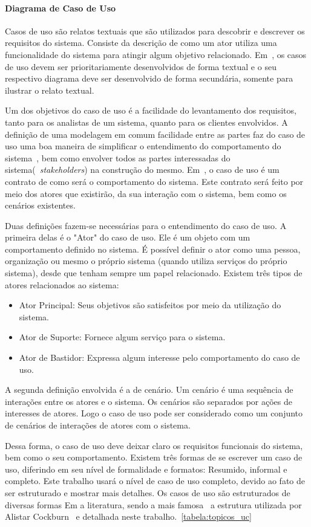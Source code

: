 \paragraph{Diagrama de Caso de Uso}
Casos de uso são relatos textuais que são utilizados para descobrir e descrever os requisitos do sistema. Consiste da descrição de como um ator utiliza uma funcionalidade do sistema para atingir algum objetivo relacionado. Em~\cite{larman08}, os casos de uso devem ser prioritariamente desenvolvidos de forma textual e o seu respectivo diagrama deve ser desenvolvido de forma secundária, somente para ilustrar o relato textual.

Um dos objetivos do caso de uso é a facilidade do levantamento dos requisitos, tanto para os analistas de um sistema, quanto para os clientes envolvidos. A definição de uma modelagem em comum facilidade entre as partes faz do caso de uso uma boa maneira de simplificar o entendimento do comportamento do sistema~\cite{larman08}, bem como envolver todos as partes interessadas do sistema(~\emph{stakeholders}) na construção do mesmo. Em~\cite{cockburn01}, o caso de uso é um contrato de como será o comportamento do sistema. Este contrato será feito por meio dos atores que existirão, da sua interação com o sistema, bem como os cenários existentes.

Duas definições fazem-se necessárias para o entendimento do caso de uso. A primeira delas é o "Ator" do caso de uso. Ele é um objeto com um comportamento definido no sistema. É possível definir o ator como uma pessoa, organização ou mesmo o próprio sistema (quando utiliza serviços do próprio sistema), desde que tenham sempre um papel relacionado. Existem três tipos de atores relacionados ao sistema:
\begin{itemize}
	\item Ator Principal: Seus objetivos são satisfeitos por meio da utilização do sistema.
	\item Ator de Suporte: Fornece algum serviço para o sistema.
	\item Ator de Bastidor: Expressa algum interesse pelo comportamento do caso de uso.
\end{itemize}

A segunda definição envolvida é a de cenário. Um cenário é uma sequência de interações entre os atores e o sistema. Os cenários são separados por ações de interesses de atores. Logo o caso de uso pode ser considerado como um conjunto de cenários de interações de atores com o sistema.

Dessa forma, o caso de uso deve deixar claro os requisitos funcionais do sistema, bem como o seu comportamento. Existem três formas de se escrever um caso de uso, diferindo em seu nível de formalidade e formatos: Resumido, informal e completo. Este trabalho usará o nível de caso de uso completo, devido ao fato de ser estruturado e mostrar mais detalhes. Os casos de uso são estruturados de diversas formas Em a literatura, sendo a mais famosa~\cite{larman08} a estrutura utilizada por Alistar Cockburn~\cite{cockburn01} e detalhada neste trabalho.~\ref{tabela:topicos_uc}

